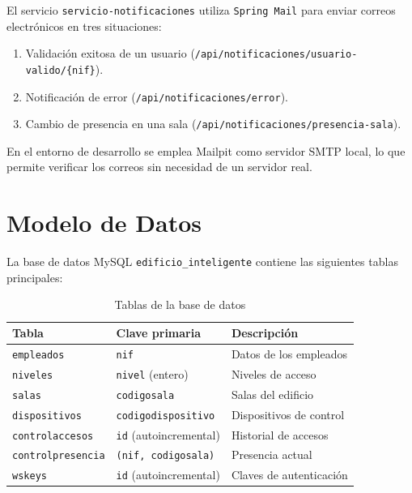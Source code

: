 \documentclass[12pt, a4paper]{article}
\begin{document}
El servicio \texttt{servicio-notificaciones} utiliza \texttt{Spring Mail} para enviar correos electrónicos en tres situaciones:

\begin{enumerate}
  \item Validación exitosa de un usuario (\texttt{/api/notificaciones/usuario-valido/\{nif\}}).
  \item Notificación de error (\texttt{/api/notificaciones/error}).
  \item Cambio de presencia en una sala (\texttt{/api/notificaciones/presencia-sala}).
\end{enumerate}

En el entorno de desarrollo se emplea Mailpit como servidor SMTP local, lo que permite verificar los correos sin necesidad de un servidor real.

\section{Modelo de Datos}

La base de datos MySQL \texttt{edificio\_inteligente} contiene las siguientes tablas principales:

\begin{table}[H]
  \centering
  \begin{tabular}{lll}
    \toprule
    \textbf{Tabla} & \textbf{Clave primaria} & \textbf{Descripción} \\
    \midrule
    \texttt{empleados}       & \texttt{nif}                       & Datos de los empleados \\
    \texttt{niveles}         & \texttt{nivel} (entero)            & Niveles de acceso \\
    \texttt{salas}           & \texttt{codigosala}                & Salas del edificio \\
    \texttt{dispositivos}    & \texttt{codigodispositivo}         & Dispositivos de control \\
    \texttt{controlaccesos}  & \texttt{id} (autoincremental)      & Historial de accesos \\
    \texttt{controlpresencia}& \texttt{(nif, codigosala)}         & Presencia actual \\
    \texttt{wskeys}          & \texttt{id} (autoincremental)      & Claves de autenticación \\
    \bottomrule
  \end{tabular}
  \caption{Tablas de la base de datos}
\end{table}
\end{document}
